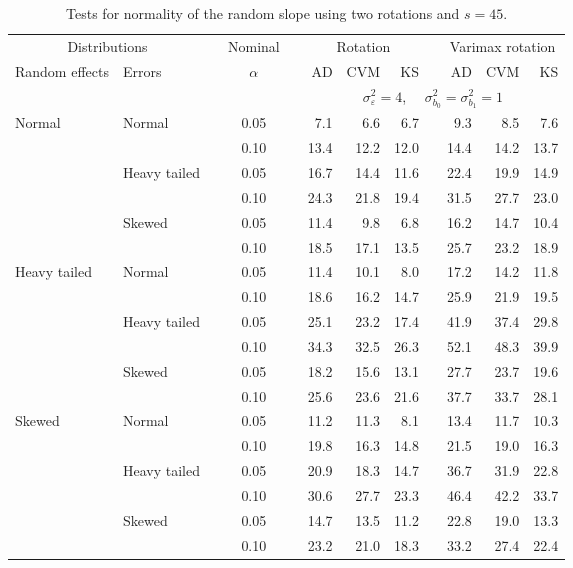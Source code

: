 \begin{table}[ht]
\caption{\label{tab:simb1s45-alt}Tests for normality of the random slope using two rotations and $s = 45$.}
\begin{scriptsize}
\begin{center}
\begin{tabular}{ll p{.1cm} c p{.1cm} rrr p{.1cm} rrr}
  \hline
  \multicolumn{2}{c}{Distributions}& & Nominal & &  \multicolumn{3}{c}{Rotation} & & \multicolumn{3}{c}{Varimax rotation} \\ \cline{1-2} \cline{6-8} \cline{10-12}   
  Random effects & Errors & & $\alpha$ & & AD & CVM & KS & & AD & CVM & KS \\ 
   \hline
& && && \multicolumn{7}{c}{$\sigma_{\varepsilon}^2 = 4$, \ \ $\sigma_{b_0}^2 = \sigma_{b_1}^2 = 1$} \\ \cline{6-12}
Normal       & Normal       && 0.05 &&   7.1 & 6.6 & 6.7 &   & 9.3 & 8.5 & 7.6 \\ 
             &              && 0.10 &&   13.4 & 12.2 & 12.0 &   & 14.4 & 14.2 & 13.7 \\ 
             & Heavy tailed && 0.05 &&   16.7 & 14.4 & 11.6 &   & 22.4 & 19.9 & 14.9 \\ 
             &              && 0.10 &&   24.3 & 21.8 & 19.4 &   & 31.5 & 27.7 & 23.0 \\ 
             & Skewed       && 0.05 &&   11.4 & 9.8 & 6.8 &   & 16.2 & 14.7 & 10.4 \\ 
             &              && 0.10 &&   18.5 & 17.1 & 13.5 &   & 25.7 & 23.2 & 18.9 \\ 
Heavy tailed & Normal       && 0.05 &&   11.4 & 10.1 & 8.0 &   & 17.2 & 14.2 & 11.8 \\ 
             &              && 0.10 &&   18.6 & 16.2 & 14.7 &   & 25.9 & 21.9 & 19.5 \\ 
             & Heavy tailed && 0.05 &&   25.1 & 23.2 & 17.4 &   & 41.9 & 37.4 & 29.8 \\ 
             &              && 0.10 &&   34.3 & 32.5 & 26.3 &   & 52.1 & 48.3 & 39.9 \\ 
             & Skewed       && 0.05 &&   18.2 & 15.6 & 13.1 &   & 27.7 & 23.7 & 19.6 \\ 
             &              && 0.10 &&   25.6 & 23.6 & 21.6 &   & 37.7 & 33.7 & 28.1 \\ 
Skewed       & Normal       && 0.05 &&   11.2 & 11.3 & 8.1 &   & 13.4 & 11.7 & 10.3 \\ 
             &              && 0.10 &&   19.8 & 16.3 & 14.8 &   & 21.5 & 19.0 & 16.3 \\ 
             & Heavy tailed && 0.05 &&   20.9 & 18.3 & 14.7 &   & 36.7 & 31.9 & 22.8 \\ 
             &              && 0.10 &&   30.6 & 27.7 & 23.3 &   & 46.4 & 42.2 & 33.7 \\ 
             & Skewed       && 0.05 &&   14.7 & 13.5 & 11.2 &   & 22.8 & 19.0 & 13.3 \\ 
             &              && 0.10 &&   23.2 & 21.0 & 18.3 &   & 33.2 & 27.4 & 22.4 \\ 


\end{tabular}
\end{center}
\end{scriptsize}
\end{table}
